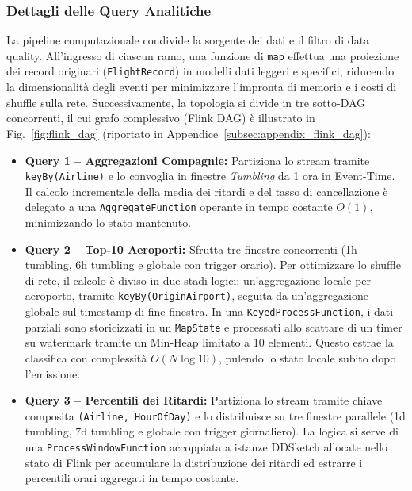 \documentclass[conference]{IEEEtran}
\begin{document}
\subsubsection{Dettagli delle Query Analitiche}\label{subsubsec:flink_queries}
La pipeline computazionale condivide la sorgente dei dati e il filtro di data quality. All'ingresso di ciascun ramo, una funzione di \texttt{map} effettua una proiezione dei record originari (\texttt{FlightRecord}) in modelli dati leggeri e specifici, riducendo la dimensionalità degli eventi per minimizzare l'impronta di memoria e i costi di shuffle sulla rete. Successivamente, la topologia si divide in tre sotto-DAG concorrenti, il cui grafo complessivo (Flink DAG) è illustrato in Fig.~\ref{fig:flink_dag} (riportato in Appendice~\ref{subsec:appendix_flink_dag}):
\begin{itemize}
    \item \textbf{Query 1 -- Aggregazioni Compagnie:} Partiziona lo stream tramite \texttt{keyBy(Airline)} e lo convoglia in finestre \textit{Tumbling} da 1 ora in Event-Time. Il calcolo incrementale della media dei ritardi e del tasso di cancellazione è delegato a una \texttt{AggregateFunction} operante in tempo costante $O(1)$, minimizzando lo stato mantenuto.
    \item \textbf{Query 2 -- Top-10 Aeroporti:} Sfrutta tre finestre concorrenti (1h tumbling, 6h tumbling e globale con trigger orario). Per ottimizzare lo shuffle di rete, il calcolo è diviso in due stadi logici: un'aggregazione locale per aeroporto, tramite \texttt{keyBy(OriginAirport)}, seguita da un'aggregazione globale sul timestamp di fine finestra. In una \texttt{KeyedProcessFunction}, i dati parziali sono storicizzati in un \texttt{MapState} e processati allo scattare di un timer su watermark tramite un Min-Heap limitato a 10 elementi. Questo estrae la classifica con complessità $O(N \log 10)$, pulendo lo stato locale subito dopo l'emissione.
    \item \textbf{Query 3 -- Percentili dei Ritardi:} Partiziona lo stream tramite chiave composita \texttt{(Airline, HourOfDay)} e lo distribuisce su tre finestre parallele (1d tumbling, 7d tumbling e globale con trigger giornaliero). La logica si serve di una \texttt{ProcessWindowFunction} accoppiata a istanze DDSketch allocate nello stato di Flink per accumulare la distribuzione dei ritardi ed estrarre i percentili orari aggregati in tempo costante.
\end{itemize}

\end{document}
